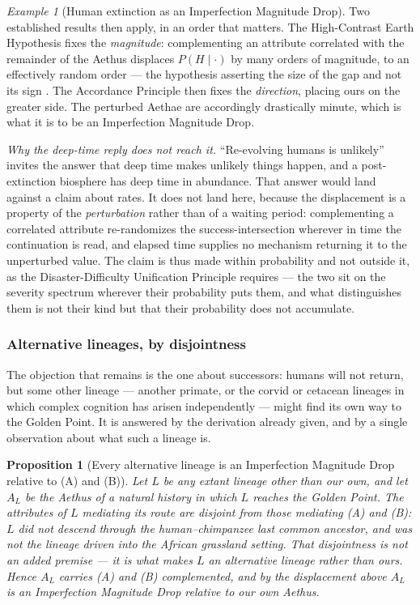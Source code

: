 \documentclass[11pt]{article}
\numberwithin{equation}{section}
\theoremstyle{plain}
\newtheorem{proposition}[theorem]{Proposition}
\theoremstyle{definition}
\theoremstyle{remark}
\newtheorem{example}[theorem]{Example}
\begin{document}
\begin{example}[Human extinction as an Imperfection Magnitude Drop]
Two established results then apply, in an order that matters. The
High-Contrast Earth Hypothesis fixes the \emph{magnitude}: complementing
an attribute correlated with the remainder of the Aethus displaces
$P(H\mid\cdot)$ by many orders of magnitude, to an effectively random
order --- the hypothesis asserting the size of the gap and not its sign
\cite{Nexus}. The Accordance Principle then fixes the \emph{direction},
placing ours on the greater side. The perturbed Aethae are accordingly
drastically minute, which is what it is to be an Imperfection Magnitude
Drop.

\emph{Why the deep-time reply does not reach it.} ``Re-evolving humans
is unlikely'' invites the answer that deep time makes unlikely things
happen, and a post-extinction biosphere has deep time in abundance. That
answer would land against a claim about rates. It does not land here,
because the displacement is a property of the \emph{perturbation} rather
than of a waiting period: complementing a correlated attribute
re-randomizes the success-intersection wherever in time the continuation
is read, and elapsed time supplies no mechanism returning it to the
unperturbed value. The claim is thus made within probability and not
outside it, as the Disaster-Difficulty Unification Principle requires
--- the two sit on the severity spectrum wherever their probability puts
them, and what distinguishes them is not their kind but that their
probability does not accumulate.

\subsubsection{Alternative lineages, by disjointness}
\label{gc:subsub:disjointness}

The objection that remains is the one about successors: humans will not
return, but some other lineage --- another primate, or the corvid or
cetacean lineages in which complex cognition has arisen independently
--- might find its own way to the Golden Point. It is answered by the
derivation already given, and by a single observation about what such a
lineage is.

\begin{proposition}[Every alternative lineage is an Imperfection
Magnitude Drop relative to (A) and (B)]\label{gc:prop:disjoint}
Let $L$ be any extant lineage other than our own, and let $A_L$ be the
Aethus of a natural history in which $L$ reaches the Golden Point.
The attributes of $L$ mediating its route are \emph{disjoint} from
those mediating (A) and (B): $L$ did not descend through the
human--chimpanzee last common ancestor, and was not the lineage driven
into the African grassland setting. That disjointness is not an added
premise --- it is what makes $L$ an alternative lineage rather than
ours. Hence $A_L$ carries (A) and (B) complemented, and by the
displacement above $A_L$ is an Imperfection Magnitude Drop relative to
our own Aethus.
\end{proposition}


\end{example}
\end{document}
